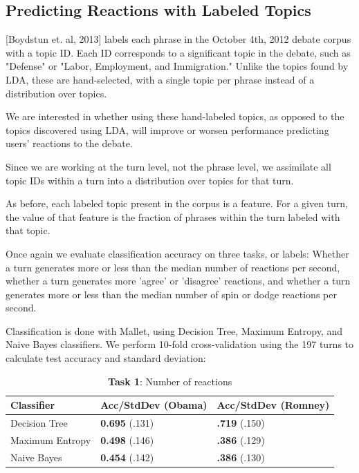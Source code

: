 \documentclass[12pt]{article}
\begin{document}
\subsection{Predicting Reactions with Labeled Topics}

[Boydstun et. al, 2013] labels each phrase in the October 4th, 2012 debate corpus with a topic ID. Each ID corresponds to a significant topic in the debate, such as "Defense" or "Labor, Employment, and Immigration." Unlike the topics found by LDA, these are hand-selected, with a single topic per phrase instead of a distribution over topics.

We are interested in whether using these hand-labeled topics, as opposed to the topics discovered using LDA, will improve or worsen performance predicting users' reactions to the debate.

Since we are working at the turn level, not the phrase level, we assimilate all topic IDs within a turn into a distribution over topics for that turn.

As before, each labeled topic present in the corpus is a feature. For a given turn, the value of that feature is the fraction of phrases within the turn labeled with that topic.

Once again we evaluate classification accuracy on three tasks, or labels: Whether a turn generates more or less than the median number of reactions per second, whether a turn generates more 'agree' or 'disagree' reactions, and whether a turn generates more or less than the median number of spin or dodge reactions per second.

Classification is done with Mallet, using Decision Tree, Maximum Entropy, and Naive Bayes classifiers. We perform 10-fold cross-validation using the 197 turns to calculate test accuracy and standard deviation:

\begin{table}[H]
\begin{centering}
\begin{tabular}{ l | l | l }
Classifier & Acc/StdDev (Obama) & Acc/StdDev (Romney) \\
\hline
Decision Tree & \textbf{0.695} (.131) &  \textbf{.719} (.150) \\
Maximum Entropy & \textbf{0.498} (.146) &  \textbf{.386} (.129) \\
Naive Bayes & \textbf{0.454} (.142) &  \textbf{.386} (.130) \\
\end{tabular}
\caption{\textbf{Task 1}: Number of reactions}
\end{centering}
\end{table}
\end{document}
